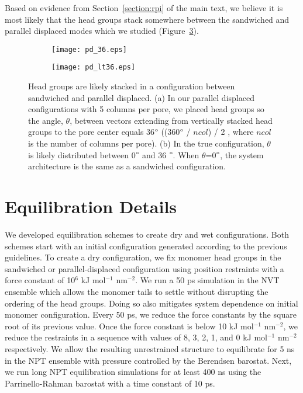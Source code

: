   Based on evidence from Section~\ref{section:rpi} of the main text, we
  believe it is most likely that the head groups stack somewhere between
  the sandwiched and parallel displaced modes which we studied (Figure~\ref{S-fig:between_pd}).

  \begin{figure}[!htb]
  \centering
  \begin{subfigure}{0.45\textwidth}
  \centering
  \texttt{[image: pd\_36.eps]}
  \caption{}\label{S-fig:pd_36}
  \end{subfigure}
  \begin{subfigure}{0.45\textwidth}
  \centering
  \texttt{[image: pd\_lt36.eps]}
  \caption{}\label{S-fig:pd_lt36}
  \end{subfigure}
  \caption{Head groups are likely stacked in a configuration between sandwiched and
  parallel displaced. (a) In our parallel displaced configurations with 5 columns 
  per pore, we placed head groups so the angle, $\theta$, between vectors extending
  from vertically stacked head groups to the pore center equals 36$\degree$ 
  ((360$\degree$ / $ncol$) / 2 , where $ncol$ is the number of columns per pore). 
  (b) In the true configuration, $\theta$ is likely distributed between 0$\degree$
  and 36 $\degree$. When $\theta$=0$\degree$, the system architecture is the same
  as a sandwiched configuration.}\label{S-fig:between_pd}
  \end{figure}

  \section{Equilibration Details}\label{S-section:equilibration}
  
  We developed equilibration schemes to create dry and wet configurations. Both
  schemes start with an initial configuration generated according to the previous
  guidelines. To create a dry configuration, we fix monomer head groups in the
  sandwiched or parallel-displaced configuration using position restraints with a
  force constant of 10$^6$ kJ mol$^{-1}$ nm$^{-2}$. We run a 50 ps simulation in
  the NVT ensemble which allows the monomer tails to settle without disrupting
  the ordering of the head groups. Doing so also mitigates system dependence on
  initial monomer configuration. Every 50 ps, we reduce the force constants by
  the square root of its previous value. Once the force constant is below 10 kJ
  mol$^{-1}$ nm$^{-2}$, we reduce the restraints in a sequence with values of
  8, 3, 2, 1, and 0 kJ mol$^{-1}$ nm$^{-2}$ respectively. We allow the resulting
  unrestrained structure to equilibrate for 5 ns in the NPT ensemble
  with pressure controlled by the Berendsen barostat. Next, we run long NPT
  equilibration simulations for at least 400 ns using the Parrinello-Rahman
  barostat with a time constant of 10 ps.


